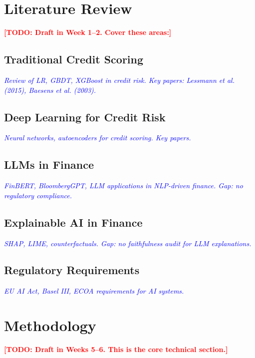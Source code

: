 \documentclass[preprint,12pt]{elsarticle}
\newcommand{\TODO}[1]{\textcolor{red}{\textbf{[TODO: #1]}}}
\newcommand{\PLACEHOLDER}[1]{\textcolor{blue}{\textit{#1}}}
\begin{document}
\section{Literature Review}
\label{sec:literature}

\TODO{Draft in Week 1--2. Cover these areas:}

\subsection{Traditional Credit Scoring}
\PLACEHOLDER{Review of LR, GBDT, XGBoost in credit risk. Key papers: Lessmann et al. (2015), Baesens et al. (2003).}

\subsection{Deep Learning for Credit Risk}
\PLACEHOLDER{Neural networks, autoencoders for credit scoring. Key papers.}

\subsection{LLMs in Finance}
\PLACEHOLDER{FinBERT, BloombergGPT, LLM applications in NLP-driven finance. Gap: no regulatory compliance.}

\subsection{Explainable AI in Finance}
\PLACEHOLDER{SHAP, LIME, counterfactuals. Gap: no faithfulness audit for LLM explanations.}

\subsection{Regulatory Requirements}
\PLACEHOLDER{EU AI Act, Basel III, ECOA requirements for AI systems.}


\section{Methodology}
\label{sec:methodology}

\TODO{Draft in Weeks 5--6. This is the core technical section.}
\end{document}
